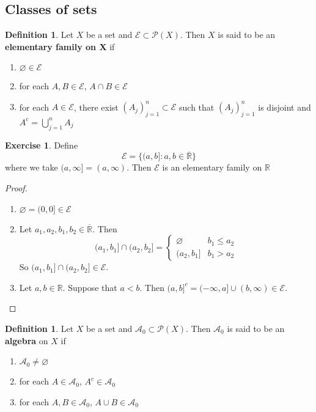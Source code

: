 \documentclass[12pt]{amsart}
\theoremstyle{definition}
\newtheorem{defn}[definition]{Definition}
\newtheorem{ex}[definition]{Exercise}
\newcommand{\R}{\mathbb{R}}
\newcommand{\MA}{\mathcal{A}}
\newcommand{\MP}{\mathcal{P}}
\newcommand{\ME}{\mathcal{E}}
\newcommand{\lex}[1]{\label{ex:#1}}
\newcommand{\ld}[1]{\label{defn:#1}}
\begin{document}
	\subsection{Classes of sets}
	
	\begin{defn} \ld{00000} 
	Let $X$ be a set and $\ME \subset \MP(X)$. Then $X$ is said to be an \textbf{elementary family on X} if 
	\begin{enumerate}
	\item $\varnothing \in \ME$
	\item for each $A, B \in \ME$, $A \cap B \in \ME$
	\item for each $A \in \ME$, there exist $(A_j)_{j=1}^n \subset \ME$ such that  $(A_j)_{j=1}^n $ is disjoint and $A^c = \bigcup\limits_{j=1}^n A_j$
	\end{enumerate}
	\end{defn}
	
	\begin{ex} \lex{00000} 
	Define $$\ME = \{(a,b]: a,b \in \overline{\R}\}$$ where we take $(a, \infty] = (a, \infty)$. Then $\ME$ is an elementary family on $\R$
	\end{ex}
	
	\begin{proof}\
	\begin{enumerate}
	\item $\varnothing = (0,0] \in \ME$
	\item Let $a_1, a_2, b_1, b_2 \in \overline{\R}$. Then 
	\[
	(a_1, b_1] \cap  (a_2, b_2] =
	\begin{cases}
	\varnothing  & b_1 \leq a_2 \\
	(a_2, b_1] & b_1 > a_2 
	\end{cases} 
	\]
	So $(a_1, b_1] \cap  (a_2, b_2] \in \ME$.
	\item Let $a, b \in \R$. Suppose that $a < b$. Then $(a,b]^c = (-\infty, a] \cup (b, \infty) \in \ME$. 
	\end{enumerate}
	\end{proof}
	
	\begin{defn} \ld{00000} 
		Let $X$ be a set and $\MA_0 \subset \MP(X)$. Then $\MA_0$ is said to be an \textbf{algebra} on $X$ if 
		\begin{enumerate}
			\item $\MA_0 \neq \varnothing$
			\item for each $A \in \MA_0$, $A^c \in \MA_0$
			\item for each $A,B \in \MA_0$, $A \cup B \in \MA_0$
		\end{enumerate}
	\end{defn}
	
\end{document}
